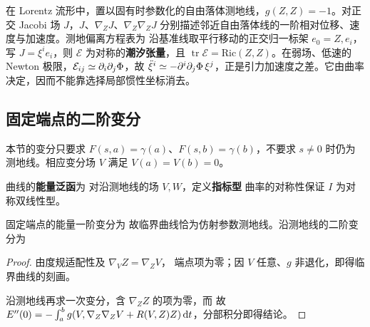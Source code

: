 \begin{example}[潮汐]
    在 Lorentz 流形中，置以固有时参数化的自由落体测地线，$g(Z,Z)=-1$。对正交 Jacobi 场 $J$，$J$、$\nabla_ZJ$、$\nabla_Z\nabla_ZJ$ 分别描述邻近自由落体线的一阶相对位移、速度与加速度。测地偏离方程表为
    沿基准线取平行移动的正交归一标架 $e_0=Z,e_i$，写 $J=\xi^ie_i$，则
    $\mathcal E$ 为对称的\textbf{潮汐张量}，且 $\operatorname{tr}\mathcal E=\mathrm{Ric}(Z,Z)$。在弱场、低速的 Newton 极限，$\mathcal E_{ij}\simeq\partial_i\partial_j\Phi$，故 $\ddot\xi^i\simeq-\partial^i\partial_j\Phi\,\xi^j$，正是引力加速度之差。它由曲率决定，因而不能靠选择局部惯性坐标消去。
\end{example}

\subsection{固定端点的二阶变分}

本节的变分只要求 $F(s,a)=\gamma(a)$、$F(s,b)=\gamma(b)$，不要求 $s\ne0$ 时仍为测地线。相应变分场 $V$ 满足 $V(a)=V(b)=0$。

\begin{definition}
    曲线的\textbf{能量泛函}为
    对沿测地线的场 $V,W$，定义\textbf{指标型}
    曲率的对称性保证 $I$ 为对称双线性型。
\end{definition}

\begin{theorem}[能量的变分]
    固定端点的能量一阶变分为
    故临界曲线恰为仿射参数测地线。沿测地线的二阶变分为
\end{theorem}
\begin{proof}
    由度规适配性及 $\nabla_VZ=\nabla_ZV$，
    端点项为零；因 $V$ 任意、$g$ 非退化，即得临界曲线的刻画。

    沿测地线再求一次变分，含 $\nabla_ZZ$ 的项为零，而
    故 $E''(0)=-\int_a^b g(V,\nabla_Z\nabla_ZV+R(V,Z)Z)\,\dd t$，分部积分即得结论。
\end{proof}

